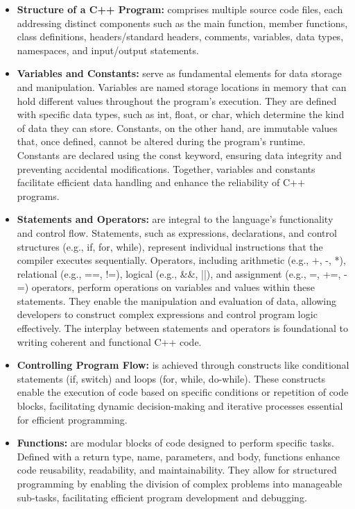     \begin{itemize}
            \item \textbf{Structure of a C++ Program:} comprises multiple source code files, each addressing distinct components such as the main function, member functions, class definitions, headers/standard headers, comments, variables, data types, namespaces, and input/output statements. \cite{structure_cpp}
            
            \item \textbf{Variables and Constants:} serve as fundamental elements for data storage and manipulation. Variables are named storage locations in memory that can hold different values throughout the program's execution. They are defined with specific data types, such as int, float, or char, which determine the kind of data they can store. Constants, on the other hand, are immutable values that, once defined, cannot be altered during the program’s runtime. Constants are declared using the const keyword, ensuring data integrity and preventing accidental modifications. Together, variables and constants facilitate efficient data handling and enhance the reliability of C++ programs.
            
            \item \textbf{Statements and Operators:} are integral to the language's functionality and control flow. Statements, such as expressions, declarations, and control structures (e.g., if, for, while), represent individual instructions that the compiler executes sequentially. Operators, including arithmetic (e.g., +, -, *), relational (e.g., ==, !=), logical (e.g., \&\&, ||), and assignment (e.g., =, +=, -=) operators, perform operations on variables and values within these statements. They enable the manipulation and evaluation of data, allowing developers to construct complex expressions and control program logic effectively. The interplay between statements and operators is foundational to writing coherent and functional C++ code.
            
            \item \textbf{Controlling Program Flow:} is achieved through constructs like conditional statements (if, switch) and loops (for, while, do-while). These constructs enable the execution of code based on specific conditions or repetition of code blocks, facilitating dynamic decision-making and iterative processes essential for efficient programming.
            
            \item \textbf{Functions:} are modular blocks of code designed to perform specific tasks. Defined with a return type, name, parameters, and body, functions enhance code reusability, readability, and maintainability. They allow for structured programming by enabling the division of complex problems into manageable sub-tasks, facilitating efficient program development and debugging.


\end{itemize}
